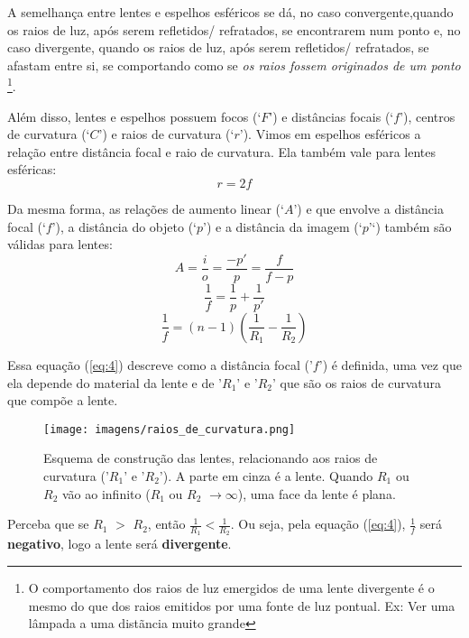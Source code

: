 \documentclass[12pt]{extarticle}
\newcommand{\<}{\langle}
\renewcommand{\>}{\rangle}
\theoremstyle{definition}
\begin{document}
A semelhança entre lentes e espelhos esféricos se dá, no caso convergente,quando os raios de luz, após serem refletidos/ refratados, se encontrarem num ponto e, no caso divergente, quando os raios de luz, após serem refletidos/ refratados, se afastam entre si, se comportando como se \textit{os raios fossem originados de um ponto} \footnote{O comportamento dos raios de luz emergidos de uma lente divergente é o mesmo do  que dos raios emitidos por uma fonte de luz pontual. Ex: Ver uma lâmpada a uma distãncia muito grande}.

Além disso, lentes e espelhos possuem focos (‘$F$’) e distâncias focais (‘$f$’), centros de curvatura (‘$C$’) e raios de curvatura (‘$r$’). Vimos em espelhos esféricos a relação entre distância focal e raio de curvatura. Ela também vale para lentes esféricas:
\begin{equation} \label{eq:1}
    r= 2f
\end{equation}

Da mesma forma, as relações de aumento linear (‘$A$’) e que envolve a distância focal (‘$f$’), a distância do objeto (‘$p$’) e a distância da imagem (‘$p’$‘) também são válidas para lentes:
\begin{equation} \label{eq:2}
   A= \frac{i}{o} = \frac{-p'}{p} = \frac{f}{f-p} 
\end{equation}
\begin{equation} \label{eq:3}
    \frac{1}{f}=\frac{1}{p}+ \frac{1}{p'}
\end{equation}
\begin{equation} \label{eq:4}
    \frac{1}{f} = (n-1)(\frac{1}{R_{1}} - \frac{1}{R_{2}})
\end{equation}

Essa equação (\ref{eq:4}) descreve como a distância focal ('$f$') é definida, uma vez que ela depende do material da lente e de '$R_{1} $' e '$R_{2}$' que são os raios de curvatura que compõe a lente.

\begin{figure} [H]
    \centering
    \texttt{[image: imagens/raios\_de\_curvatura.png]}
    \caption{Esquema de construção das lentes, relacionando aos raios de curvatura ('$R_{1}$' e '$R_{2}$'). A parte em cinza é a lente. Quando $R_{1}$ ou $R_{2}$ vão ao infinito ($R_{1}$ ou $R_{2}$ $\to\infty$), uma face da lente é plana. \cite{scielo}} 
    \label{fig:constr_lente}
\end{figure}

Perceba que se $R_{1}$ $>$ $R_{2}$, então $\frac{1}{R_{1}} < \frac{1}{R_{2}}$. Ou seja, pela equação (\ref{eq:4}), $\frac{1}{f}$ será \textbf{negativo}, logo a lente será \textbf{divergente}.
\end{document}
